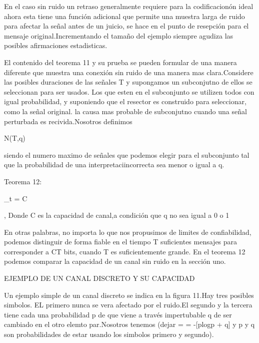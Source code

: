 En el caso sin ruido un retraso generalmente requiere para la codificacion\'on ideal ahora \bigskip esta tiene una funci\'on adicional que permite una muestra larga de ruido para afectar la señal antes de un juicio, se hace \bigskipen en el punto de resepci\'on  para el mensaje original.Incrementando el tamaño del ejemplo siempre agudiza las posibles afirmaciones estadisticas.

El contenido del teorema 11 y su prueba se pueden formular de una manera diferente que muestra \bigskipen una conexi\'on sin ruido de una manera mas clara.Considere las posibles duraciones de las señales T y supongamos \bigskipen un subconjutno de ellos se seleccionan para ser usados. Los que esten en el subconjunto se utilizen todos con igual probabilidad, y suponiendo \bigskipen que el resector es construido para seleccionar, como la señal original. la causa mas probable de subconjutno cuando \bigskipen una señal perturbada es recivida.Nosotros definimos \begin{em}N(T,q)\end{em} siendo el numero maximo de señales que podemos elegir para el subconjunto tal que la probabilidad de una interpretaci\on incorrecta sea menor o igual a q.

\begin{em}Teorema 12:\end{em} \displaystyle\lim_{t \to{}\infty} = C \begin{em}, Donde C es la capacidad de canal,a condici\'on que q no sea igual a 0 o 1\end{em}

En otras palabras, no importa lo que nos propusimos de limites de confiabilidad, podemos distinguir de forma fiable en el tiempo T \bigskipen suficientes mensajes para corresponder a CT bits, cuando T es suficientemente grande. En el teorema 12 podemos comparar \bigskipen la capacidad de un canal sin ruido en la secci\'on uno.

\begin{center}
EJEMPLO DE UN CANAL DISCRETO Y SU CAPACIDAD
\end{center} 

Un ejemplo simple de un canal discreto se indica en la figura 11.Hay tres posibles simbolos. EL primero \bigskipen nunca se vera afectado por el ruido.El segundo y la tercera tiene cada una probabilidad p de que viene a trav\'es impertubable q de ser cambiado en el otro elemto par.Nosotros tenemos (dejar =  \alpha = -[plogp + q] y p y q son probabilidades de estar usando los simbolos primero y segundo).

